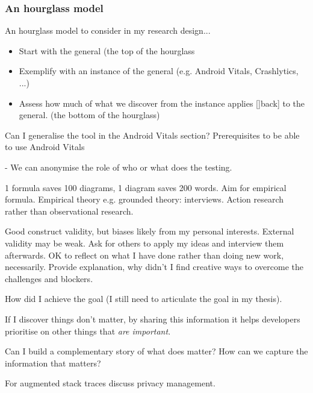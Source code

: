\subsubsection{An hourglass model}
An hourglass model to consider in my research design...

\begin{itemize}
    \item Start with the general (the top of the hourglass
    \item Exemplify with an instance of the general (e.g. Android Vitals, Crashlytics, ...)
    \item Assess how much of what we discover from the instance applies []back] to the general. (the bottom of the hourglass)
\end{itemize}

Can I generalise the tool in the Android Vitals section? Prerequisites to be able to use Android Vitals

- We can anonymise the role of who or what does the testing.



    1 formula saves 100 diagrams, 1 diagram saves 200 words. Aim for empirical formula. Empirical theory e.g. grounded theory: interviews. Action research rather than observational research.
    
    Good construct validity, but biases likely from my personal interests.  
    External validity may be weak. Ask for others to apply my ideas and interview them afterwards. OK to reflect on what I have done rather than doing new work, necessarily. Provide explanation, why didn't I find creative ways to overcome the challenges and blockers. 
    
    How did I achieve the goal (I still need to articulate the goal in my thesis). 
    
    If I discover things don't matter, by sharing this information it helps developers prioritise on other things that \textit{are important}. 
    
    Can I build a complementary story of what does matter? How can we capture the information that matters?
    
    For augmented stack traces discuss privacy management. 
    
